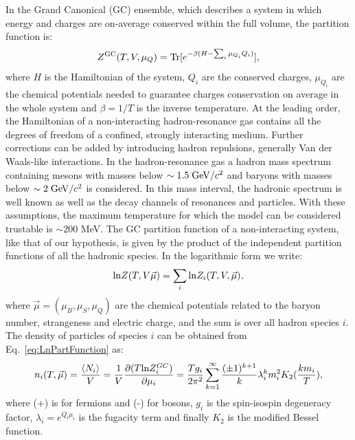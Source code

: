 In the Grand Canonical (GC) ensemble, which describes a system in which 
energy and charges are on-average conserved within the full volume, the partition function is:
\begin{equation}
  \label{eq:PartitionFunction}
Z^{\rm GC} (T, V, \mu_{Q}) = {\rm Tr}[e^{-\beta(H - \sum_{i}{\mu_{Q_{i}}Q_{i}})}],
\end{equation}
where $H$ is the Hamiltonian of the system, $Q_{i}$ are the conserved charges, 
$\mu_{Q_{i}}$ are the chemical potentials needed to guarantee charges 
conservation on average in the whole system and $\beta = 1/T$ is 
the inverse temperature. At the leading order, the Hamiltonian of a non-interacting 
hadron-resonance gas contains all the degrees of freedom of a 
confined, strongly interacting medium. Further corrections can be added by 
introducing hadron repulsions, generally Van der Waals-like interactions. 
In the hadron-resonance gas a hadron mass 
spectrum containing mesons with masses below $\sim 1.5 \; \mathrm{GeV}/c^{2}$ and 
baryons with masses below $\sim 2\; \mathrm{GeV}/c^{2}$ is considered. In this mass interval, the 
hadronic spectrum is well known as well as the decay channels of resonances 
and particles. With these assumptions, the maximum temperature for which
 the model can be considered trustable is $\sim 200$ MeV. The GC partition 
 function of a non-interacting system, like that of our hypothesis, is given by 
 the product of the independent partition functions of all the hadronic species. 
 In the logarithmic form we write:
\begin{equation}
  \label{eq:LnPartFunction}
{\rm ln} Z(T, V \vec{\mu}) = \sum_{i} {\rm ln} Z_{i} (T, V, \vec{\mu}),
\end{equation}
where $\vec{\mu} = (\mu_B, \mu_S, \mu_Q)$ are the chemical potentials 
related to the baryon number, strangeness and 
electric charge, and the sum is over all hadron species $i$.
The density of particles of species $i$ can be obtained from Eq.~\ref{eq:LnPartFunction} as:
\begin{equation}
\label{eq:ParticleDensity}
n_{i} (T, \vec{\mu}) = \frac{\langle N_{i} \rangle}{V} = \frac{1}{V}\frac{\partial (T {\rm ln}Z_i^{GC})}{\partial \mu_i} = \frac{T g_{i}}{2\pi^{2}} \sum_{k=1}^{\infty} \frac{(\pm 1)^{k+1}}{k} \lambda_{i}^{k} m_{i}^{2}K_{2}(\frac{km_{i}}{T}),
\end{equation}
where (+) is for fermions and (-) for bosons, $g_{i}$ is the spin-isospin 
degeneracy factor, $\lambda_{i} = e^{Q_{i}\mu_{i}}$ is the fugacity 
term and finally $K_{2}$ is the modified Bessel function.
